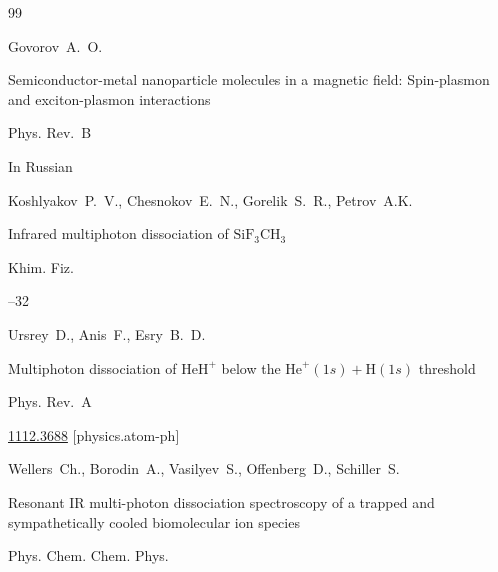 \begin{thebibliography}{99}

\by Govorov~A.~O.

\paper Semiconductor-metal nanoparticle molecules in a magnetic field: Spin-plasmon and exciton-plasmon interactions 

\jour Phys. Rev.~B









\lang In Russian

\by Koshlyakov~P.~V.,  Chesnokov~E.~N., Gorelik~S.~R., Petrov~A.K.

\paper Infrared multiphoton dissociation of $\mathrm{SiF_3CH_3}$

\jour Khim. Fiz.




--32








\by Ursrey~D., Anis~F., Esry~B.~D. 

\paper Multiphoton dissociation of $\text{HeH}^{+}$ below the $\text{He}^+(1s) + \text{H}(1s)$ threshold

\jour Phys. Rev.~A





\arxiv \href{http://arxiv.org/abs/1112.3688}{1112.3688} [physics.atom-ph]




\by Wellers~Ch., Borodin~A., Vasilyev~S., Offenberg~D., Schiller~S.

\paper Resonant IR multi-photon dissociation spectroscopy of a trapped and sympathetically cooled biomolecular ion species 

\jour Phys. Chem. Chem. Phys. 



\end{thebibliography}
